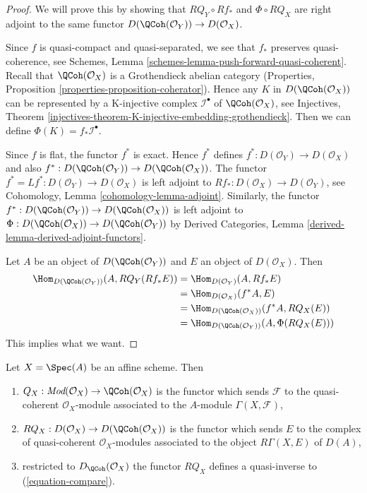 \begin{proof}
We will prove this by showing that $RQ_Y \circ Rf_*$ and $\Phi \circ RQ_X$
are right adjoint to the same functor
$D(\QCoh(\mathcal{O}_Y)) \to D(\mathcal{O}_X)$.

\medskip\noindent
Since $f$ is quasi-compact and quasi-separated, we see that
$f_*$ preserves quasi-coherence, see
Schemes, Lemma \ref{schemes-lemma-push-forward-quasi-coherent}.
Recall that $\QCoh(\mathcal{O}_X)$ is a Grothendieck abelian category
(Properties, Proposition \ref{properties-proposition-coherator}).
Hence any $K$ in $D(\QCoh(\mathcal{O}_X))$
can be represented by a K-injective complex $\mathcal{I}^\bullet$
of $\QCoh(\mathcal{O}_X)$, see
Injectives, Theorem
\ref{injectives-theorem-K-injective-embedding-grothendieck}.
Then we can define $\Phi(K) = f_*\mathcal{I}^\bullet$.

\medskip\noindent
Since $f$ is flat, the functor $f^*$ is exact. Hence $f^*$ defines
$f^* : D(\mathcal{O}_Y) \to D(\mathcal{O}_X)$ and also
$f^* : D(\QCoh(\mathcal{O}_Y)) \to D(\QCoh(\mathcal{O}_X))$.
The functor $f^* = Lf^* : D(\mathcal{O}_Y) \to D(\mathcal{O}_X)$
is left adjoint to
$Rf_* : D(\mathcal{O}_X) \to D(\mathcal{O}_Y)$,
see Cohomology, Lemma \ref{cohomology-lemma-adjoint}.
Similarly, the functor
$f^* : D(\QCoh(\mathcal{O}_Y)) \to D(\QCoh(\mathcal{O}_X))$
is left adjoint to
$\Phi : D(\QCoh(\mathcal{O}_X)) \to D(\QCoh(\mathcal{O}_Y))$
by Derived Categories, Lemma \ref{derived-lemma-derived-adjoint-functors}.

\medskip\noindent
Let $A$ be an object of $D(\QCoh(\mathcal{O}_Y))$ and
$E$ an object of $D(\mathcal{O}_X)$. Then
\begin{align*}
\Hom_{D(\QCoh(\mathcal{O}_Y))}(A, RQ_Y(Rf_*E))
& =
\Hom_{D(\mathcal{O}_Y)}(A, Rf_*E) \\
& =
\Hom_{D(\mathcal{O}_X)}(f^*A, E) \\
& =
\Hom_{D(\QCoh(\mathcal{O}_X))}(f^*A, RQ_X(E)) \\
& =
\Hom_{D(\QCoh(\mathcal{O}_Y))}(A, \Phi(RQ_X(E)))
\end{align*}
This implies what we want.
\end{proof}

\begin{lemma}
\label{lemma-affine-coherator}
Let $X = \Spec(A)$ be an affine scheme. Then
\begin{enumerate}
\item $Q_X : \textit{Mod}(\mathcal{O}_X) \to \QCoh(\mathcal{O}_X)$
is the functor
which sends $\mathcal{F}$ to the quasi-coherent $\mathcal{O}_X$-module
associated to the $A$-module $\Gamma(X, \mathcal{F})$,
\item $RQ_X : D(\mathcal{O}_X) \to D(\QCoh(\mathcal{O}_X))$
is the functor which sends $E$ to the complex of quasi-coherent
$\mathcal{O}_X$-modules associated to the object $R\Gamma(X, E)$ of $D(A)$,
\item restricted to $D_\QCoh(\mathcal{O}_X)$ the functor
$RQ_X$ defines a quasi-inverse to (\ref{equation-compare}).
\end{enumerate}
\end{lemma}

